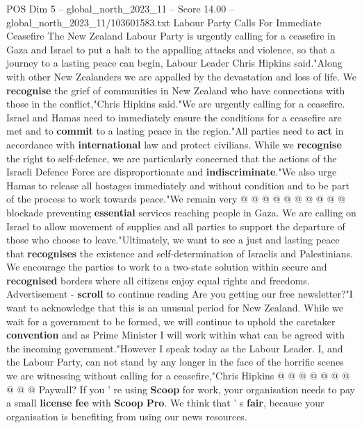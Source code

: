 \begin{textsample}{POS Dim 5 – global\_north\_2023\_11 – Score 14.00 – global\_north\_2023\_11/103601583.txt}  \label{ex:f5_pos_414}
Labour Party Calls For Immediate Ceasefire The New Zealand Labour Party is urgently calling for a ceasefire in Gaza and Israel to put a halt to the appalling attacks and violence, so that a journey to a lasting peace can begin, Labour Leader Chris Hipkins said."Along with other New Zealanders we are appalled by the devastation and loss of life.
We \textbf{recognise} the grief of communities in New Zealand who have connections with those in the conflict,"Chris Hipkins said."We are urgently calling for a ceasefire.
Israel and Hamas need to immediately ensure the conditions for a ceasefire are met and to \textbf{commit} to a lasting peace in the region."All parties need to \textbf{act} in accordance with \textbf{international} law and protect civilians.
While we \textbf{recognise} the right to self-defence, we are particularly concerned that the actions of the Israeli Defence Force are disproportionate and \textbf{indiscriminate}."We also urge Hamas to release all hostages immediately and without condition and to be part of the process to work towards peace."We remain very @ @ @ @ @ @ @ @ @ @ blockade preventing \textbf{essential} services reaching people in Gaza.
We are calling on Israel to allow movement of supplies and all parties to support the departure of those who choose to leave."Ultimately, we want to see a just and lasting peace that \textbf{recognises} the existence and self-determination of Israelis and Palestinians.
We encourage the parties to work to a two-state solution within secure and \textbf{recognised} borders where all citizens enjoy equal rights and freedoms.
Advertisement - \textbf{scroll} to continue reading Are you getting our free newsletter?"I want to acknowledge that this is an unusual period for New Zealand.
While we wait for a government to be formed, we will continue to uphold the caretaker \textbf{convention} and as Prime Minister I will work within what can be agreed with the incoming government."However I speak today as the Labour Leader.
I, and the Labour Party, can not stand by any longer in the face of the horrific scenes we are witnessing without calling for a ceasefire,"Chris Hipkins @ @ @ @ @ @ @ @ @ @ Paywall?
If you ' re using \textbf{Scoop} for work, your organisation needs to pay a small \textbf{license} \textbf{fee} with \textbf{Scoop} \textbf{Pro}.
We think that ' s \textbf{fair}, because your organisation is benefiting from using our news resources.

\end{textsample}
